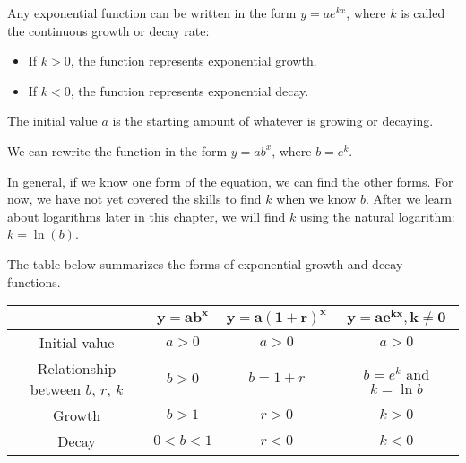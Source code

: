 Any exponential function can be written in the form \( y = ae^{kx} \), where \( k \) is called the continuous growth or decay rate:
\begin{itemize}
    \item If \( k > 0 \), the function represents exponential growth.
    \item If \( k < 0 \), the function represents exponential decay.
\end{itemize}
The initial value \( a \) is the starting amount of whatever is growing or decaying.

We can rewrite the function in the form \( y = ab^x \), where \( b = e^k \).

In general, if we know one form of the equation, we can find the other forms. For now, we have not yet covered the skills to find \( k \) when we know \( b \). After we learn about logarithms later in this chapter, we will find \( k \) using the natural logarithm: \( k = \ln(b) \).

The table below summarizes the forms of exponential growth and decay functions.

\begin{center}
    \begin{tabular}{|c|c|c|c|}
        \hline
                                                 & \(\boldsymbol{y = ab^x}\) & \(\boldsymbol{y = a(1+r)^x}\) & \(\boldsymbol{y = ae^{kx}}, \boldsymbol{k \neq 0}\) \\
        \hline
        Initial value                            & \(a>0\)                   & \(a>0\)                       & \(a>0\)                                             \\
        \hline
        Relationship between \(b\), \(r\), \(k\) & \(b > 0\)                 & \(b=1+ r\)                    & \(b = e^k\) and \(k = \ln b\)                       \\
        \hline
        Growth                                   & \(b > 1\)                 & \(r > 0\)                     & \(k > 0\)                                           \\
        \hline
        Decay                                    & \(0 < b < 1\)             & \(r < 0\)                     & \(k < 0\)                                           \\
        \hline
    \end{tabular}
\end{center}

